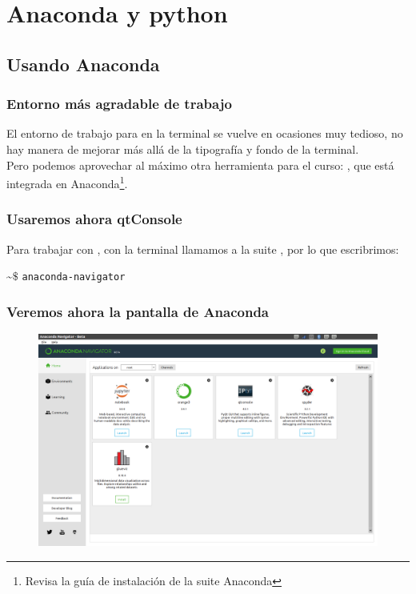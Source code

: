 \documentclass[12pt]{beamer}
\begin{document}
\section{Anaconda y python}
\subsection{Usando Anaconda}
{
\begin{frame}
\frametitle{Entorno más agradable de trabajo}
El entorno de trabajo para \python{} en la terminal se vuelve en ocasiones muy tedioso, no hay manera de mejorar más allá de la tipografía y fondo de la terminal.
\\
\bigskip
Pero podemos aprovechar al máximo otra herramienta para el curso: , que está integrada en Anaconda\footnote{Revisa la guía de instalación de la suite Anaconda}.
\end{frame}
\begin{frame}
\frametitle{Usaremos ahora qtConsole}
Para trabajar con , con la terminal llamamos a la suite , por lo que escribrimos:
\begin{center}
\textasciitilde $\$$ \texttt{anaconda-navigator} \keys{\return}
\end{center}
\end{frame}
\begin{frame}
\frametitle{Veremos ahora la pantalla de Anaconda}
\begin{figure}
	\centering
	\includegraphics[scale=0.2]{Figuras/anaconda_01.png}
\end{figure}
\end{frame}
}
\end{document}
